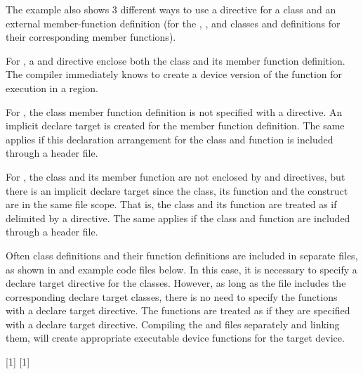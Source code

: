 \begin{cppspecific}

The example also shows 3 different ways to use a  directive for a
class and an external member-function definition (for the , , 
and  classes and definitions for their corresponding  member functions).

For , a  and
 directive
enclose both the class and its member function definition. The compiler immediately
knows to create a device version of the function for execution in a  region.

For , the class member function definition is not specified with a
 directive.
An implicit declare target is created for the member function definition.
The same applies if this declaration arrangement for the class and function 
is included through a header file.

For , the class and its member function are not enclosed by 
and  directives,
but there is an implicit declare target since the class, its function
and the  construct are in the same file scope. That is, the class
and its function are treated as if delimited by a  directive.
The same applies if the class and function are included through a header file.



Often class definitions and their function definitions are included in separate files,
as shown in  and  example code files below.
In this case, it is necessary to specify a declare target directive for the classes.
However, as long as the  file includes the corresponding declare target classes,
there is no need to specify the functions with a declare target directive.
The functions are treated as if they are specified with a declare target directive.
Compiling the  and  files 
separately and linking them, will create appropriate executable device functions for the target device.

\smallskip
{}[1]
\smallskip
{}[1]


\end{cppspecific}
